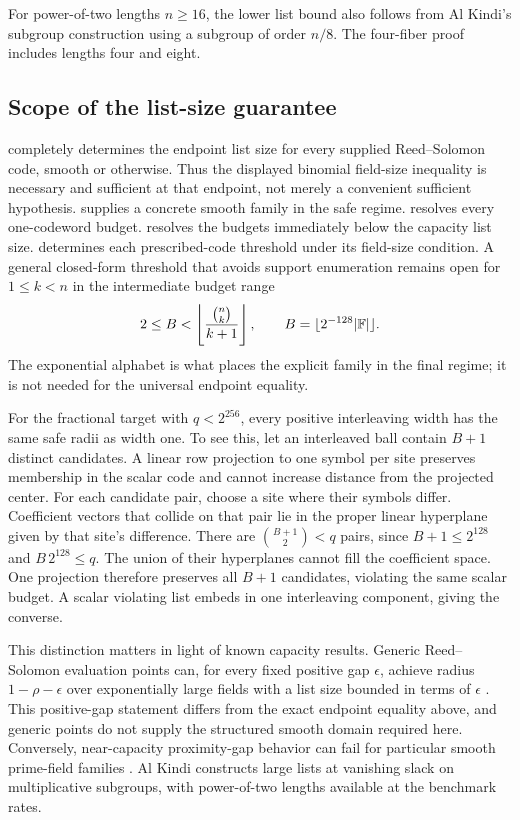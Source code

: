 For power-of-two lengths \(n\ge16\), the lower list bound also follows
from Al Kindi's subgroup construction \cite[Theorem~1.1]{kindi2026nearCapacity}
using a subgroup of order \(n/8\). The four-fiber proof includes lengths
four and eight.

\subsection{Scope of the list-size guarantee}

 completely determines the endpoint list size
for every supplied Reed--Solomon code, smooth or otherwise.  Thus the displayed
binomial field-size inequality is necessary and sufficient at that endpoint,
not merely a convenient sufficient hypothesis.
 supplies a concrete smooth family in the safe
regime.  resolves every one-codeword budget.
 resolves the budgets immediately below
the capacity list size.  determines each
prescribed-code threshold under its field-size condition. A general
closed-form threshold that avoids support enumeration remains open for
\(1\le k<n\) in the intermediate budget range
\[
  2\le B<\left\lfloor\frac{\binom nk}{k+1}\right\rfloor,
  \qquad B=\lfloor2^{-128}|\mathbb{F}|\rfloor.
\]
The exponential alphabet is what places the explicit family in the final
regime; it is not needed for the universal endpoint equality.

For the fractional target with \(q<2^{256}\), every positive interleaving
width has the same safe radii as width one. To see this, let an interleaved
ball contain \(B+1\) distinct candidates. A linear row projection to one
symbol per site preserves membership in the scalar code and cannot increase
distance from the projected center. For each candidate pair, choose a site
where their symbols differ. Coefficient vectors that collide on that pair
lie in the proper linear hyperplane given by that site's difference.
There are \(\binom{B+1}{2}<q\) pairs, since \(B+1\le2^{128}\) and
\(B\,2^{128}\le q\). The union of their hyperplanes cannot fill the
coefficient space. One projection therefore preserves all \(B+1\)
candidates, violating the same scalar budget. A scalar violating list
embeds in one interleaving component, giving the converse.

This distinction matters in light of known capacity results.  Generic
Reed--Solomon evaluation points can, for every fixed positive gap
\(\epsilon\), achieve radius \(1-\rho-\epsilon\) over exponentially large
fields with a list size bounded in terms of \(\epsilon\)
\cite{brakensiekGopiMakam2024}. This positive-gap statement differs from the
exact endpoint equality above, and generic points do not supply the
structured smooth domain required here. Conversely, near-capacity proximity-gap
behavior can fail for particular smooth prime-field families
\cite{kambire2026}. Al Kindi \cite{kindi2026nearCapacity} constructs large
lists at vanishing slack on multiplicative subgroups, with power-of-two
lengths available at the benchmark rates.

